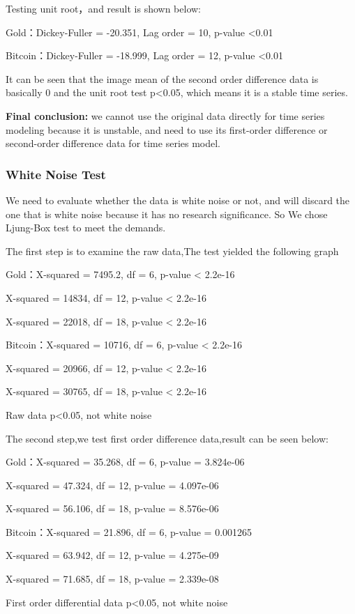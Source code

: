 \documentclass{mcmthesis}
\begin{document}
Testing unit root，and result is shown below:

Gold：Dickey-Fuller = -20.351, Lag order = 10, p-value <0.01

Bitcoin：Dickey-Fuller = -18.999, Lag order = 12, p-value <0.01

It can be seen that the image mean of the second order difference data is basically 0 and the unit root test p<0.05, which means it is a stable time series.

\textbf{Final conclusion:} we cannot use the original data directly for time series modeling because it is unstable, and need to use its first-order difference or second-order difference data for time series model.


\subsubsection{White Noise Test}
We need to evaluate whether the data is white noise or not, 
and will discard the one that is white noise because it has no research significance.
So We chose Ljung-Box test to meet the demands.

The first step is to examine the raw data,The test yielded the following graph

Gold：X-squared = 7495.2, df = 6, p-value < 2.2e-16

X-squared = 14834, df = 12, p-value < 2.2e-16

X-squared = 22018, df = 18, p-value < 2.2e-16

Bitcoin：X-squared = 10716, df = 6, p-value < 2.2e-16

X-squared = 20966, df = 12, p-value < 2.2e-16

X-squared = 30765, df = 18, p-value < 2.2e-16


Raw data p<0.05, not white noise

The second step,we test first order difference data,result can be seen below:

Gold：X-squared = 35.268, df = 6, p-value = 3.824e-06

X-squared = 47.324, df = 12, p-value = 4.097e-06

X-squared = 56.106, df = 18, p-value = 8.576e-06

Bitcoin：X-squared = 21.896, df = 6, p-value = 0.001265

X-squared = 63.942, df = 12, p-value = 4.275e-09

X-squared = 71.685, df = 18, p-value = 2.339e-08

First order differential data p<0.05, not white noise
\end{document}
